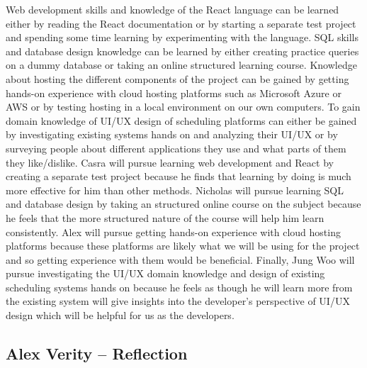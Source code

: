 \documentclass[12pt]{article}
\begin{document}
\begin{enumerate}
  Web development skills and knowledge of the React language can be learned either by reading 
  the React documentation or by starting a separate test project and spending some time 
  learning by experimenting with the language. SQL skills and database design knowledge can 
  be learned by either creating practice queries on a dummy database or taking an online 
  structured learning course. Knowledge about hosting the different components of the project 
  can be gained by getting hands-on experience with cloud hosting platforms such as Microsoft 
  Azure or AWS or by testing hosting in a local environment on our own computers. To gain 
  domain knowledge of UI/UX design of scheduling platforms can either be gained by 
  investigating existing systems hands on and analyzing their UI/UX or by surveying people 
  about different applications they use and what parts of them they like/dislike.
  Casra will pursue learning web development and React by creating a separate test project 
  because he finds that learning by doing is much more effective for him than other methods. 
  Nicholas will pursue learning SQL and database design by taking an structured online course 
  on the subject because he feels that the more structured nature of the course will help him 
  learn consistently. Alex will pursue getting hands-on experience with cloud hosting 
  platforms because these platforms are likely what we will be using for the project and 
  so getting experience with them would be beneficial. Finally, Jung Woo will pursue 
  investigating the UI/UX domain knowledge and design of existing scheduling systems hands 
  on because he feels as though he will learn more from the existing system will give 
  insights into the developer's perspective of UI/UX design which will be helpful for us as 
  the developers.

\end{enumerate}

\subsection*{Alex Verity -- Reflection}
\end{document}
